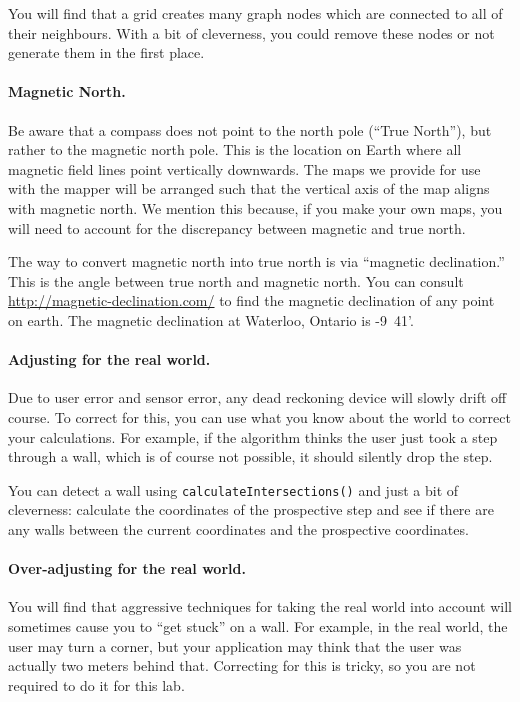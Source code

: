 \documentclass[10pt]{article}
\begin{document}
You will find that a grid creates many graph nodes which are connected
to all of their neighbours. With a bit of cleverness, you could remove
these nodes or not generate them in the first place.

\paragraph{Magnetic North.}
Be aware that a compass does not point to the north pole (``True North''), but rather to the magnetic north pole. This is the location on Earth where all magnetic field lines point vertically downwards. The maps we provide for use with the mapper will be arranged such that the vertical axis of the map aligns with magnetic north. We mention this because, if you make your own maps, you will need to account for the discrepancy between magnetic and true north.

The way to convert magnetic north into true north is via ``magnetic declination.'' This is the angle between true north and magnetic north. You can consult \url{http://magnetic-declination.com/} to find the magnetic declination of any point on earth. The magnetic declination at Waterloo, Ontario is -9\textdegree\ 41'.

\paragraph{Adjusting for the real world.}
Due to user error and sensor error, any dead reckoning device will slowly drift off course. To correct for this, you can use what you know about the world to correct your calculations. For example, if the algorithm thinks the user just took a step through a wall, which is of course not possible, it should silently drop the step. 

You can detect a wall using {\tt calculateIntersections()} and just a bit of cleverness: calculate the coordinates of the prospective step and see if there are any walls between the current coordinates and the prospective coordinates.

\paragraph{Over-adjusting for the real world.}
You will find that aggressive techniques for taking the real world into account will sometimes cause you to ``get stuck'' on a wall. For example, in the real world, the user may turn a corner, but your application may think that the user was actually two meters behind that. Correcting for this is tricky, so you are not required to do it for this lab.
\end{document}
